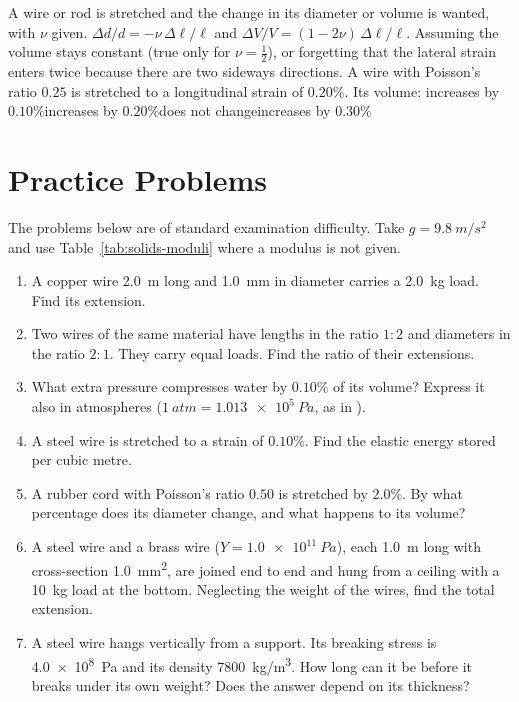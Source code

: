 {A wire or rod is stretched and the change in its diameter or volume is wanted, with $\nu$ given.}
{$\Delta d/d=-\nu\,\Delta\ell/\ell$ and $\Delta V/V=(1-2\nu)\,\Delta\ell/\ell$.}
{Assuming the volume stays constant (true only for $\nu=\tfrac12$), or forgetting that the lateral strain
enters twice because there are two sideways directions.}
{A wire with Poisson's ratio $0.25$ is stretched to a longitudinal strain of $0.20\%$. Its volume:}
{increases by $0.10\%$}{increases by $0.20\%$}{does not change}{increases by $0.30\%$}

\section{Practice Problems}\label{sec:practice-solids}

The problems below are of standard examination difficulty. Take $g=\SI{9.8}{m/s^2}$ and use
Table~\ref{tab:solids-moduli} where a modulus is not given.

\begin{enumerate}[itemsep=3pt]
\item A copper wire \SI{2.0}{m} long and \SI{1.0}{mm} in diameter carries a \SI{2.0}{kg} load. Find its
      extension.
\item Two wires of the same material have lengths in the ratio $1:2$ and diameters in the ratio $2:1$.
      They carry equal loads. Find the ratio of their extensions.
\item What extra pressure compresses water by $0.10\%$ of its volume? Express it also in atmospheres
      ($\SI{1}{atm}=\SI{1.013e5}{Pa}$, as in ).
\item A steel wire is stretched to a strain of $0.10\%$. Find the elastic energy stored per cubic metre.
\item A rubber cord with Poisson's ratio $0.50$ is stretched by $2.0\%$. By what percentage does its
      diameter change, and what happens to its volume?
\item A steel wire and a brass wire ($Y=\SI{1.0e11}{Pa}$), each \SI{1.0}{m} long with cross-section
      \SI{1.0}{mm^2}, are joined end to end and hung from a ceiling with a \SI{10}{kg} load at the bottom.
      Neglecting the weight of the wires, find the total extension.
\item A steel wire hangs vertically from a support. Its breaking stress is \SI{4.0e8}{Pa} and its density
      \SI{7800}{kg/m^3}. How long can it be before it breaks under its own weight? Does the answer depend
      on its thickness?
\end{enumerate}

